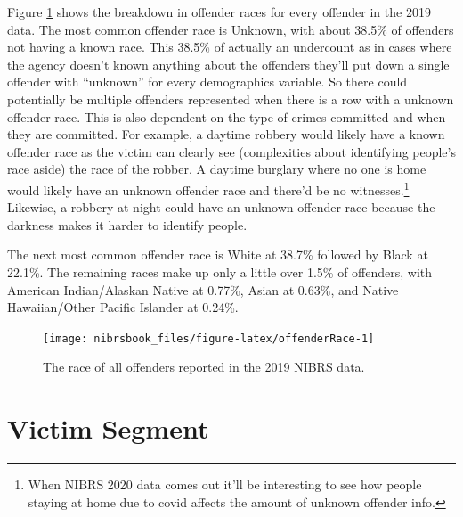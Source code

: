 \documentclass[
  12pt,
  openany]{book}
\begin{document}
Figure \ref{fig:offenderRace} shows the breakdown in offender races for every offender in the 2019 data. The most common offender race is Unknown, with about 38.5\% of offenders not having a known race. This 38.5\% of actually an undercount as in cases where the agency doesn't known anything about the offenders they'll put down a single offender with ``unknown'' for every demographics variable. So there could potentially be multiple offenders represented when there is a row with a unknown offender race. This is also dependent on the type of crimes committed and when they are committed. For example, a daytime robbery would likely have a known offender race as the victim can clearly see (complexities about identifying people's race aside) the race of the robber. A daytime burglary where no one is home would likely have an unknown offender race and there'd be no witnesses.\footnote{When NIBRS 2020 data comes out it'll be interesting to see how people staying at home due to covid affects the amount of unknown offender info.} Likewise, a robbery at night could have an unknown offender race because the darkness makes it harder to identify people.

The next most common offender race is White at 38.7\% followed by Black at 22.1\%. The remaining races make up only a little over 1.5\% of offenders, with American Indian/Alaskan Native at 0.77\%, Asian at 0.63\%, and Native Hawaiian/Other Pacific Islander at 0.24\%.

\begin{figure}

{\centering \texttt{[image: nibrsbook\_files/figure-latex/offenderRace-1]} 

}

\caption{The race of all offenders reported in the 2019 NIBRS data.}\label{fig:offenderRace}
\end{figure}

\hypertarget{victim-segment-1}{%
\chapter{Victim Segment}\label{victim-segment-1}}
\end{document}
